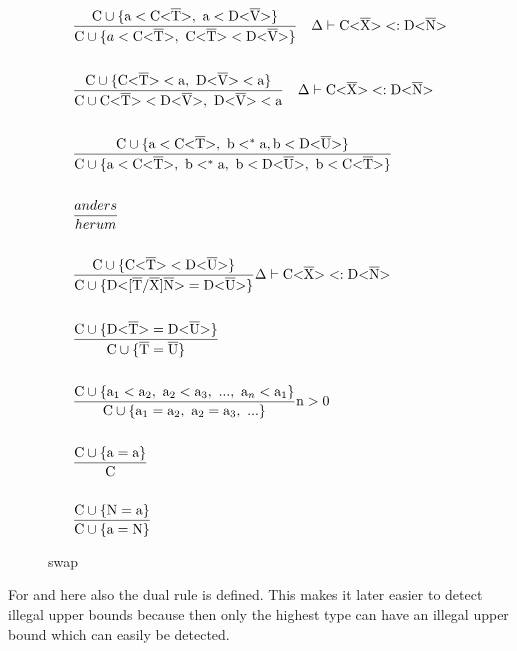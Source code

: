 \begin{figure}[H]
    \begin{align*}
        &\frac{\cand \{ \text{a} < \nvt{C}{T}, \ \text{a} < \nvt{D}{V} \} }{ \cand \{ a < \nvt{C}{T}, \ \nvt{C}{T} < \nvt{D}{V} \} } \quad \Delta \vdash \nvt{C}{X} <: \nvt{D}{N}\\
        \\
        &\frac{\cand \{ \nvt{C}{T} < \text{a}, \ \nvt{D}{V} < \text{a} \} }{ \cand \nvt{C}{T} < \nvt{D}{V}, \ \nvt{D}{V} < \text{a} } \quad \Delta \vdash \nvt{C}{X} <: \nvt{D}{N}\\
        \\
        &\frac{\cand \{ \text{a} < \nvt{C}{T}, \ \text{b} <^* \text{a}, \text{b} < \nvt{D}{U}  \} }{ \cand \{ \text{a} < \nvt{C}{T}, \ \text{b} <^* \text{a}, \ \text{b} < \nvt{D}{U}, \ \text{b} < \nvt{C}{T} \} }\\
        \\
        &\frac{anders}{herum}\\
        \\
        &\frac{\cand \{ \nvt{C}{T} < \nvt{D}{U} \} }{ \cand \{ \text{D<} \tsxsns{T}{X}{N} \text{>} = \nvt{D}{U} \} } \Delta \vdash \nvt{C}{X} <: \nvt{D}{N}\\
        \\
        &\frac{\cand \{ \nvt{D}{T} = \nvt{D}{U} \} }{\cand \{ \ot{T} = \ot{U} \} }\\
        \\
        &\frac{\cand \{ \text{a}_1 < \text{a}_2, \ \text{a}_2 < \text{a}_3, \ ..., \ \text{a}_n < \text{a}_1 \} }{\cand \{ \text{a}_1 = \text{a}_2, \ \text{a}_2 = \text{a}_3, \ ... \} } \text{n} > 0\\
        \\
        &\frac{\cand \{ \text{a} = \text{a} \} }{\text{C}}\\
        \\
        &\frac{\cand \{ \text{N} = \text{a} \} }{\cand \{ \text{a} = \text{N} \} }
    \end{align*}
    \caption{swap}
    \label{swap}
\end{figure}

For  and  here also the dual rule is defined. This makes it later easier to detect illegal upper bounds because then only the highest type can have an illegal upper bound which can easily be detected.

